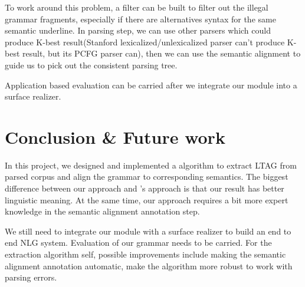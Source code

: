 \documentclass[a4paper]{article}
\begin{document}
To work around this problem, a filter can be built to filter out the illegal grammar fragments, especially if there are alternatives syntax for the same semantic underline. In parsing step, we can use other parsers which could produce K-best result(Stanford lexicalized/unlexicalized parser can't produce K-best result, but its PCFG parser can), then we can use the semantic alignment to guide us to pick out the consistent parsing tree.

Application based evaluation can be carried after we integrate our module into a surface realizer.

\section{Conclusion \& Future work}
In this project, we designed and implemented a algorithm to extract LTAG from parsed corpus and align the grammar to corresponding semantics. The biggest difference between our approach and \citet{DeVault2008a}'s approach is that our result has better linguistic meaning. At the same time, our approach requires a bit more expert knowledge in the semantic alignment annotation step. 

We still need to integrate our module with a surface realizer to build an end to end NLG system. Evaluation of our grammar needs to be carried.
For the extraction algorithm self, possible improvements include making the semantic alignment annotation automatic, make the algorithm more robust to work with parsing errors.
\printbibliography
\end{document}

